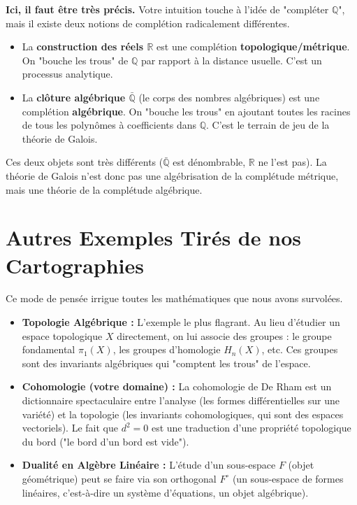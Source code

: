 \begin{proposition}
    \textbf{Ici, il faut être très précis.} Votre intuition touche à l'idée de "compléter $\mathbb{Q}$", mais il existe deux notions de complétion radicalement différentes.
    \begin{itemize}
        \item La \textbf{construction des réels $\mathbb{R}$} est une complétion \textbf{topologique/métrique}. On "bouche les trous" de $\mathbb{Q}$ par rapport à la distance usuelle. C'est un processus analytique.
        \item La \textbf{clôture algébrique $\bar{\mathbb{Q}}$} (le corps des nombres algébriques) est une complétion \textbf{algébrique}. On "bouche les trous" en ajoutant toutes les racines de tous les polynômes à coefficients dans $\mathbb{Q}$. C'est le terrain de jeu de la théorie de Galois.
    \end{itemize}
    Ces deux objets sont très différents ($\bar{\mathbb{Q}}$ est dénombrable, $\mathbb{R}$ ne l'est pas). La théorie de Galois n'est donc pas une algébrisation de la complétude métrique, mais une théorie de la complétude algébrique.
\end{proposition}

\section{Autres Exemples Tirés de nos Cartographies}

\begin{remark}
    Ce mode de pensée irrigue toutes les mathématiques que nous avons survolées.
    \begin{itemize}
        \item \textbf{Topologie Algébrique :} L'exemple le plus flagrant. Au lieu d'étudier un espace topologique $X$ directement, on lui associe des groupes : le groupe fondamental $\pi_1(X)$, les groupes d'homologie $H_n(X)$, etc. Ces groupes sont des invariants algébriques qui "comptent les trous" de l'espace.
        \item \textbf{Cohomologie (votre domaine) :} La cohomologie de De Rham est un dictionnaire spectaculaire entre l'analyse (les formes différentielles sur une variété) et la topologie (les invariants cohomologiques, qui sont des espaces vectoriels). Le fait que $d^2=0$ est une traduction d'une propriété topologique du bord ("le bord d'un bord est vide").
        \item \textbf{Dualité en Algèbre Linéaire :} L'étude d'un sous-espace $F$ (objet géométrique) peut se faire via son orthogonal $F^\circ$ (un sous-espace de formes linéaires, c'est-à-dire un système d'équations, un objet algébrique).
    \end{itemize}
\end{remark}